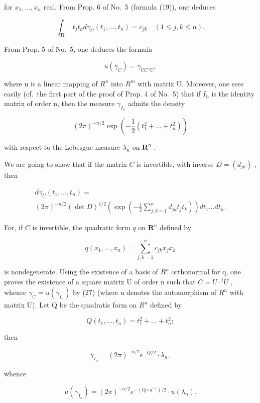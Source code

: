 for \(x_{1}, \ldots, x_{n}\) real. From Prop. 6 of No.~5 (formula (19)), one deduces

\[
\int_ {\mathbf {R} ^ {n}} t _ {j} t _ {k} d \gamma_ {C} (t _ {1}, \dots , t _ {n}) = c _ {j k} \quad (1 \leqslant j, k \leqslant n).\tag{26}
\]

From Prop. 5 of No.~5, one deduces the formula

\[
u (\gamma_ {C}) = \gamma_{U C\,{}^{t}U}  ,\tag{27}
\]

where u is a linear mapping of \(R^{n}\) into \(R^{m}\) with matrix U. Moreover, one sees easily (cf.~the first part of the proof of Prop. 4 of No.~5) that if \(I_{n}\) is the identity matrix of order n, then the measure \(\gamma_{I_{n}}\) admits the density

\[
(2 \pi) ^ {- n / 2} \exp \left(- \frac {1}{2} (t _ {1} ^ {2} + \dots + t _ {n} ^ {2})\right)
\]

with respect to the Lebesgue measure \(\lambda_{n}\) on \(\mathbf{R}^{n}\) .

We are going to show that if the matrix \(C\) is invertible, with inverse \(D = (d_{jk})\) , then

\[
\begin{array}{l} d \gamma_ {C} (t _ {1}, \dots , t _ {n}) = \\ (2 \pi) ^ {- n / 2} (\det D) ^ {1 / 2} \left(\exp \left(- \frac {1}{2} \sum_ {j, k = 1} ^ {n} d _ {j k} t _ {j} t _ {k}\right)\right) d t _ {1} \dots d t _ {n}. \end{array}\tag{28}
\]

For, if \(C\) is invertible, the quadratic form \(q\) on \(\mathbf{R}^n\) defined by

\[
q (x _ {1}, \dots , x _ {n}) = \sum_ {j, k = 1} ^ {n} c _ {j k} x _ {j} x _ {k}
\]

is nondegenerate. Using the existence of a basis of \(R^{n}\) orthonormal for q, one proves the existence of a square matrix U of order n such that \(C = U \cdot {}^{t}U\) , whence \(\gamma_{C} = u(\gamma_{I_{n}})\) by (27) (where u denotes the automorphism of \(R^{n}\) with matrix U). Let Q be the quadratic form on \(R^{n}\) defined by

\[
Q (t _ {1}, \dots , t _ {n}) = t _ {1} ^ {2} + \dots + t _ {n} ^ {2};
\]

then

\[
\gamma_ {I _ {n}} = (2 \pi) ^ {- n / 2} e ^ {- Q / 2} \cdot \lambda_ {n},
\]

whence

\[
u (\gamma_ {I _ {n}}) = (2 \pi) ^ {- n / 2} e ^ {- (\mathrm{Q} \circ u ^ {- 1}) / 2} \cdot u (\lambda_ {n}).\tag{29}
\]

